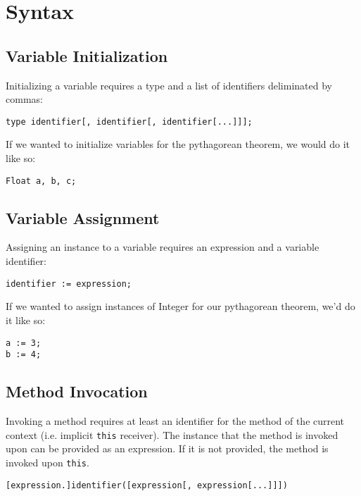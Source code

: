 \section{Syntax}
\subsection{Variable Initialization}
Initializing a variable requires a type and a list of identifiers deliminated by commas:

\begin{lstlisting}
type identifier[, identifier[, identifier[...]]];
\end{lstlisting}

If we wanted to initialize variables for the pythagorean theorem, we would do it like so:

\begin{lstlisting}[caption=Variable Initialization for the Pythagorean Theorem]
Float a, b, c;
\end{lstlisting}

\subsection{Variable Assignment}
Assigning an instance to a variable requires an expression and a variable identifier:

\begin{lstlisting}
identifier := expression;
\end{lstlisting}

If we wanted to assign instances of Integer for our pythagorean theorem, we'd do it like so:

\begin{lstlisting}[caption=Variable Assignment for the Pythagorean Theorem]
a := 3;
b := 4;
\end{lstlisting}

\subsection{Method Invocation}
Invoking a method requires at least an identifier for the method of the current context (i.e. implicit \verb!this! receiver). The instance that the method is invoked upon can be provided as an expression. If it is not provided, the method is invoked upon \verb!this!.

\begin{lstlisting}
[expression.]identifier([expression[, expression[...]]])
\end{lstlisting}

